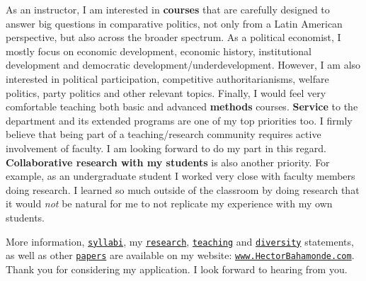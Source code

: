\documentclass[10pt,stdletter,dateno,sigleft]{newlfm} %
\begin{document}
\begin{newlfm}
As an instructor, I am interested in {\bf courses} that are carefully designed to answer big questions in comparative politics, not only from a Latin American perspective, but also across the broader spectrum. As a political economist, I mostly focus on economic development, economic history, institutional development and democratic development/underdevelopment. However, I am also interested in political participation, competitive authoritarianisms, welfare politics, party politics and other relevant topics. Finally, I would feel very comfortable teaching both basic and advanced {\bf methods} courses. {\bf Service} to the department and its extended programs are one of my top priorities too. I firmly believe that being part of a teaching/research community requires active involvement of faculty. I am looking forward to do my part in this regard. {\bf Collaborative research with my students} is also another priority. For example, as an undergraduate student I worked very close with faculty members doing research. I learned so much outside of the classroom by doing research that it would \emph{not} be natural for me to not replicate my experience with my own students. 



More information, \href{http://www.hectorbahamonde.com/teaching/}{\texttt{syllabi}}, my \href{http://github.com/hbahamonde/Job_Market/raw/master/Bahamonde_Research_Statement.pdf}{\texttt{research}}, \href{http://github.com/hbahamonde/Job_Market/raw/master/Bahamonde_Teaching_Statement.pdf}{\texttt{teaching}} and \href{http://github.com/hbahamonde/Job_Market/raw/master/Bahamonde_Diversity_Statement.pdf}{\texttt{diversity}} statements, as well as other \href{http://www.hectorbahamonde.com/research/}{\texttt{papers}} are available on my website: \href{http://www.hectorbahamonde.com}{\texttt{www.HectorBahamonde.com}}. Thank you for considering my application. I look forward to hearing from you.






\end{newlfm}
\end{document}
